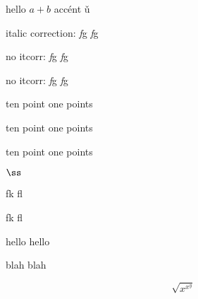 \documentclass[11pt]{article}
\begin{document}
hello $a+b$ acc\'ent \v u

italic correction: \textit{f}g {\itshape f}g

\def\nocorrlist{g}
no itcorr: \textit{f}g {\itshape f}g

\def\nocorrlist{}
no itcorr: \textit{f\nocorr}g {\itshape f}g

{\fontsize{10.1pt}{10.1pt}\selectfont ten point one points}

{\fontsize{10.1pt}{10.1pt}\selectfont ten point one points}

{\fontsize{10.1pt}{10.1pt}\selectfont ten point one points}

$\ss$ %

fk fl

\selectfont

fk fl

hello \selectfont hello

blah \fontsize{18.7}{0}\selectfont blah

\[
\sqrt{x^{x^y}}
\]
\end{document}
